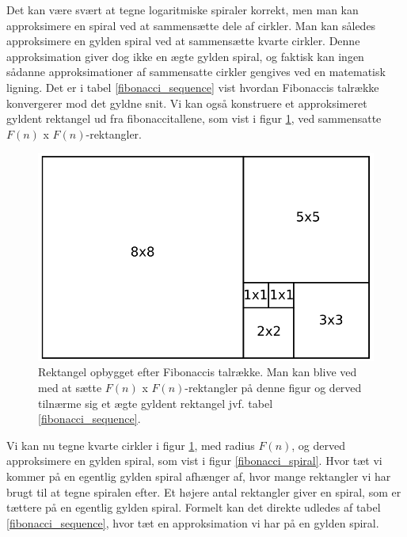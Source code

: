 {Det kan være svært at tegne logaritmiske spiraler korrekt, men man kan
approksimere en spiral ved at sammensætte dele af cirkler. Man kan
således approksimere en gylden spiral ved at sammensætte kvarte cirkler.
Denne approksimation giver dog ikke en ægte gylden spiral, og faktisk kan
ingen sådanne approksimationer af sammensatte cirkler gengives ved en
matematisk ligning\cite{Sharp2002}. Det er i tabel
\ref{fibonacci_sequence} vist hvordan Fibonaccis talrække konvergerer
mod det gyldne snit. Vi kan også konstruere et approksimeret gyldent
rektangel ud fra fibonaccitallene, som vist i figur
\ref{fibonacci_rektangel}, ved sammensatte $F(n)$ x $F(n)$-rektangler.
\begin{figure}[h!]
	\begin{center}
		\includegraphics[scale=0.35,angle=0]{afsnit/baggrund/billeder/fib_rect}
	\end{center}
    \caption[Rektangel opbygget efter Fibonaccis talrække]{Rektangel
    opbygget efter Fibonaccis talrække. Man kan blive ved med at sætte
    $F(n)$ x $F(n)$-rektangler på denne figur og derved tilnærme sig et
    ægte gyldent rektangel jvf. tabel \ref{fibonacci_sequence}.}
	\label{fibonacci_rektangel}
\end{figure}
Vi kan nu tegne kvarte cirkler i figur \ref{fibonacci_rektangel}, med
radius $F(n)$, og derved approksimere en gylden spiral, som vist i figur
\ref{fibonacci_spiral}. Hvor tæt vi kommer på en egentlig gylden spiral
afhænger af, hvor mange rektangler vi har brugt til at tegne spiralen
efter. Et højere antal rektangler giver en spiral, som er tættere på en
egentlig gylden spiral. Formelt kan det direkte udledes af tabel
\ref{fibonacci_sequence}, hvor tæt en approksimation vi har på en gylden
spiral.
\begin{figure}[h!]

\end{figure}}
